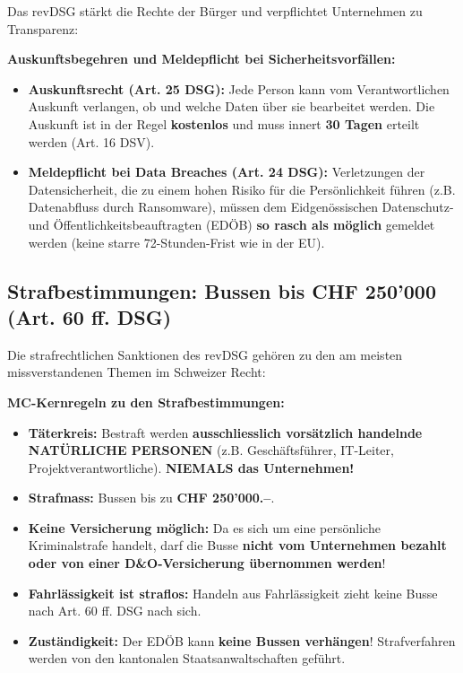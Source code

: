 Das revDSG stärkt die Rechte der Bürger und verpflichtet Unternehmen zu Transparenz:

\begin{theorem}
    \textbf{Auskunftsbegehren und Meldepflicht bei Sicherheitsvorfällen:}
    \begin{itemize}
        \item \textbf{Auskunftsrecht (Art. 25 DSG):} Jede Person kann vom Verantwortlichen Auskunft verlangen, ob und welche Daten über sie bearbeitet werden. Die Auskunft ist in der Regel \textbf{kostenlos} und muss innert \textbf{30 Tagen} erteilt werden (Art. 16 DSV).
        \item \textbf{Meldepflicht bei Data Breaches (Art. 24 DSG):} Verletzungen der Datensicherheit, die zu einem hohen Risiko für die Persönlichkeit führen (z.B. Datenabfluss durch Ransomware), müssen dem Eidgenössischen Datenschutz- und Öffentlichkeitsbeauftragten (EDÖB) \textbf{so rasch als möglich} gemeldet werden (keine starre 72-Stunden-Frist wie in der EU).
    \end{itemize}
\end{theorem}

\subsection{Strafbestimmungen: Bussen bis CHF 250'000 (Art. 60 ff. DSG)}

Die strafrechtlichen Sanktionen des revDSG gehören zu den am meisten missverstandenen Themen im Schweizer Recht:

\begin{theorem}
    \textbf{MC-Kernregeln zu den Strafbestimmungen:}
    \begin{itemize}
        \item \textbf{Täterkreis:} Bestraft werden \textbf{ausschliesslich vorsätzlich handelnde NATÜRLICHE PERSONEN} (z.B. Geschäftsführer, IT-Leiter, Projektverantwortliche). \textbf{NIEMALS das Unternehmen!}
        \item \textbf{Strafmass:} Bussen bis zu \textbf{CHF 250'000.--}.
        \item \textbf{Keine Versicherung möglich:} Da es sich um eine persönliche Kriminalstrafe handelt, darf die Busse \textbf{nicht vom Unternehmen bezahlt oder von einer D\&O-Versicherung übernommen werden}!
        \item \textbf{Fahrlässigkeit ist straflos:} Handeln aus Fahrlässigkeit zieht keine Busse nach Art. 60 ff. DSG nach sich.
        \item \textbf{Zuständigkeit:} Der EDÖB kann \textbf{keine Bussen verhängen}! Strafverfahren werden von den kantonalen Staatsanwaltschaften geführt.
    \end{itemize}
\end{theorem}

